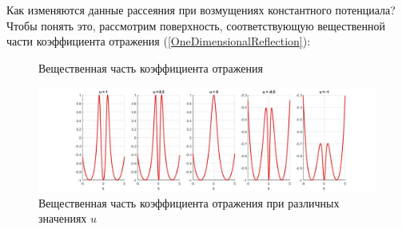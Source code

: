 \documentclass[a4 paper, 12 pt]{extarticle}
\begin{document}
   Как изменяются данные рассеяния при возмущениях константного потенциала?
   Чтобы понять это, рассмотрим поверхность, соответствующую вещественной части коэффициента отражения (\ref{OneDimensionalReflection}):
   
   \begin{figure}[!htb]
   	\begin{minipage}[h]{0.49\linewidth}
   	\end{minipage}
      	\begin{minipage}[h]{0.49\linewidth}
   \end{minipage}
   \caption{Вещественная часть коэффициента отражения}
   \label{fig:real}
   \end{figure}
   
   \begin{figure}[!htb]
   \centering
   \includegraphics[scale=0.35]{real.jpg}
   \caption{Вещественная часть коэффициента отражения при различных значениях $u$}
   \end{figure}
\end{document}
